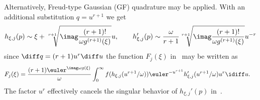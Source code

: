 Alternatively, Freud-type Gaussian (GF) quadrature may be applied. With an additional substitution $q=u^{r+1}$ we get
\begin{equation}\label{Eq4:dh_xi}
	h_{\xi,j}(p) \sim \xi + \sqrt[r+1]{\imag\frac{(r+1)!}{\omega g^{(r+1)}(\xi)}} u,\qquad h_{\xi,j}'(p) \sim \frac{\omega}{r+1}\sqrt[r+1]{\imag\frac{(r+1)!}{\omega g^{(r+1)}(\xi)}}u^{-r}
\end{equation}
since $\diff q = (r+1)u^r \diff u$ the function $F_j(\xi)$ in~ may be written as
\begin{align*}
	F_j(\xi) &= \frac{(r+1)\euler^{\imag\omega g(\xi)}}{\omega}\int_0^\infty f(h_{\xi,j}(u^{r+1}/\omega))\euler^{-u^{r+1}} h_{\xi,j}'(u^{r+1}/\omega)u^r\idiff u.
\end{align*}
The factor $u^r$ effectively cancels the singular behavior of $h_{\xi,j}'(p)$ in~.

